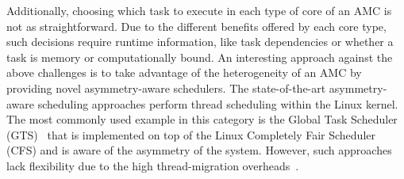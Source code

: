 Additionally, choosing which task to execute in each type of core of an AMC is not as straightforward. 
Due to the different benefits offered by each core type, such decisions require runtime information, like task dependencies or whether a task is memory or computationally bound.
An interesting approach against the above challenges is to take advantage of the heterogeneity of an AMC by providing novel asymmetry-aware schedulers. 
The state-of-the-art asymmetry-aware scheduling approaches perform thread scheduling within the Linux kernel. 
The most commonly used example in this category is the Global Task Scheduler (GTS)~\cite{?} that is implemented on top of the Linux Completely Fair Scheduler (CFS) and is aware of the asymmetry of the system.
However, such approaches lack flexibility due to the high thread-migration overheads~\cite{AMC_survey}.


